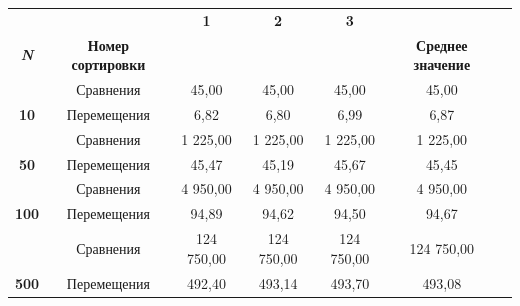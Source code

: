 \documentclass[a4paper,10pt]{article}
\begin{document}
    
    \begin{table}[H]
        \begin{tabular}{ccccccl}
                                                                &                                             & \textbf{1}           & \textbf{2}           & \textbf{3}           &                                             &  \\
        \multirow{-2}{*}{\textit{\textbf{N}}}                   & \multirow{-2}{*}{\textbf{Номер сортировки}} & \multicolumn{1}{l}{} & \multicolumn{1}{l}{} & \multicolumn{1}{l}{} & \multirow{-2}{*}{\textbf{Среднее значение}} &  \\
        {\color[HTML]{3F3B42} }                                 & Сравнения                                   & 45,00                & 45,00                & 45,00                & 45,00                                       &  \\
        \multirow{-2}{*}{{\color[HTML]{3F3B42} \textbf{10}}}    & Перемещения                                 & 6,82                 & 6,80                 & 6,99                 & 6,87                                        &  \\
        {\color[HTML]{3F3B42} }                                 & Сравнения                                   & 1 225,00             & 1 225,00             & 1 225,00             & 1 225,00                                    &  \\
        \multirow{-2}{*}{{\color[HTML]{3F3B42} \textbf{50}}}    & Перемещения                                 & 45,47                & 45,19                & 45,67                & 45,45                                       &  \\
        {\color[HTML]{3F3B42} }                                 & Сравнения                                   & 4 950,00             & 4 950,00             & 4 950,00             & 4 950,00                                    &  \\
        \multirow{-2}{*}{{\color[HTML]{3F3B42} \textbf{100}}}   & Перемещения                                 & 94,89                & 94,62                & 94,50                & 94,67                                       &  \\
        {\color[HTML]{3F3B42} }                                 & Сравнения                                   & 124 750,00           & 124 750,00           & 124 750,00           & 124 750,00                                  &  \\
        \multirow{-2}{*}{{\color[HTML]{3F3B42} \textbf{500}}}   & Перемещения                                 & 492,40               & 493,14               & 493,70               & 493,08                                      &  \\

\end{tabular}
\end{table}
\end{document}
